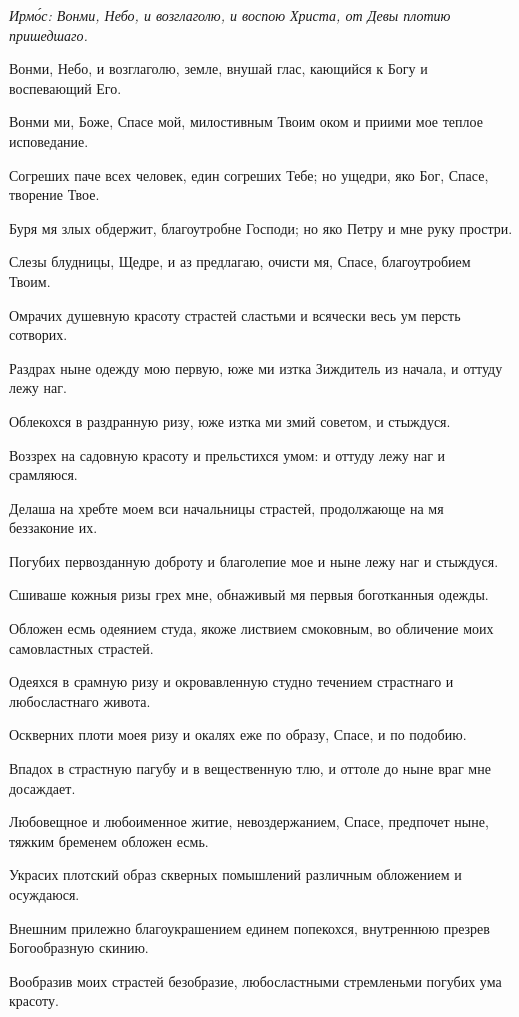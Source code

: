 
\itshape Ирм\'{о}с\normalfont{}: Вонми, Небо, и возглаголю, и воспою Христа, от Девы плотию пришедшаго.

Вонми, Небо, и возглаголю, земле, внушай глас, кающийся к Богу и воспевающий Его.

Вонми ми, Боже, Спасе мой, милостивным Твоим оком и приими мое теплое исповедание.

Согреших паче всех человек, един согреших Тебе; но ущедри, яко Бог, Спасе, творение Твое.

Буря мя злых обдержит, благоутробне Господи; но яко Петру и мне руку простри.

Слезы блудницы, Щедре, и аз предлагаю, очисти мя, Спасе, благоутробием Твоим.

Омрачих душевную красоту страстей сластьми и всячески весь ум персть сотворих.

Раздрах ныне одежду мою первую, юже ми изтка Зиждитель из начала, и оттуду лежу наг.

Облекохся в раздранную ризу, юже изтка ми змий советом, и стыждуся.

Воззрех на садовную красоту и прельстихся умом: и оттуду лежу наг и срамляюся.

Делаша на хребте моем вси начальницы страстей, продолжающе на мя беззаконие их.

Погубих первозданную доброту и благолепие мое и ныне лежу наг и стыждуся.

Сшиваше кожныя ризы грех мне, обнаживый мя первыя боготканныя одежды.

Обложен есмь одеянием студа, якоже листвием смоковным, во обличение моих самовластных страстей.

Одеяхся в срамную ризу и окровавленную студно течением страстнаго и любосластнаго живота.

Оскверних плоти моея ризу и окалях еже по образу, Спасе, и по подобию.

Впадох в страстную пагубу и в вещественную тлю, и оттоле до ныне враг мне досаждает.

Любовещное и любоименное житие, невоздержанием, Спасе, предпочет ныне, тяжким бременем обложен есмь.

Украсих плотский образ скверных помышлений различным обложением и осуждаюся.

Внешним прилежно благоукрашением единем попекохся, внутреннюю презрев Богообразную скинию.

Вообразив моих страстей безобразие, любосластными стремленьми погубих ума красоту.

